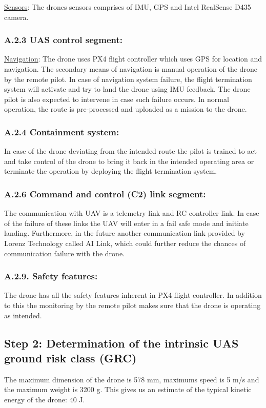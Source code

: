 \documentclass[../Head/Main.tex]{subfiles}
\begin{document}
\underline{Sensors}: The drones sensors comprises of IMU, GPS and Intel RealSense D435 camera.

\subsubsection*{A.2.3 UAS control segment:}
\underline{Navigation}: The drone uses PX4 flight controller which uses GPS for location and navigation. The secondary means of navigation is manual operation of the drone by the remote pilot. In case of navigation system failure, the flight termination system will activate and try to land the drone using IMU feedback. The drone pilot is also expected to intervene in case such failure occurs. In normal operation, the route is pre-processed and uploaded as a mission to the drone.

\subsubsection*{A.2.4 Containment system:}
In case of the drone deviating from the intended route the pilot is trained to act and take control of the drone to bring it back in the intended operating area or terminate the operation by deploying the flight termination system.

\subsubsection*{A.2.6 Command and control (C2) link segment:}
The communication with UAV is a telemetry link and RC controller link. In case of the failure of these links the UAV will enter in a fail safe mode and initiate landing. Furthermore, in the future another communication link provided by Lorenz Technology called AI Link, which could further reduce the chances of communication failure with the drone.

\subsubsection*{A.2.9. Safety features:}
The drone has all the safety features inherent in PX4 flight controller. In addition to this the monitoring by the remote pilot makes sure that the drone is operating as intended.


\subsection{Step 2: Determination of the intrinsic UAS ground risk class (GRC)}
The maximum dimension of the drone is 578 mm, maximums speed is 5 m/s and the maximum weight is 3200 g. This gives us an estimate of the typical kinetic energy of the drone: 40 J.
\end{document}
